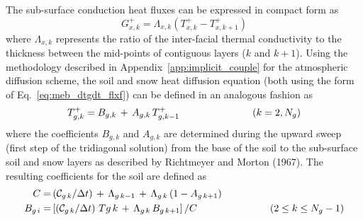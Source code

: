 {The sub-surface conduction heat fluxes 
can be expressed in compact form as
%
\begin{equation}
\label{eq:meb_g_dtgdt_fd}
%
G_{x,k}^+ = \Lambda_{x,k}\left(T_{x,k}^+-T_{x,k+1}^+\right)
%
\end{equation}
%
where $\Lambda_{x,k}$ represents the ratio of the inter-facial thermal conductivity
to the thickness between the mid-points of contiguous layers ($k$ and $k+1$).
%
%
%
%
Using the methodology described in Appendix~\ref{app:implicit_couple}
for the atmospheric diffusion scheme, the soil and snow heat diffusion
equation (both using the form of Eq.~\ref{eq:meb_dtgdt_flxf})
can be defined in an analogous fashion as
%
\begin{equation}
\label{eq:meb_g_dt_rm_sfc}
%
T_{g,k}^+ = B_{g,k} \,+\, A_{g,k} \,T_{g,k-1}^+
\hskip1.in \left(k=2,N_g\right)
%
\end{equation}
%
where the coefficients $B_{g,k}$ and $A_{g,k}$ are determined during the upward
sweep (first step of the tridiagonal solution) from the base of the
soil to the sub-surface soil and snow layers as described by
Richtmeyer and Morton (1967)\nocite{Richtmeyer_Morton_67}. 
The resulting coefficients 
for the soil are defined as
%
\begin{subequations}\label{eq:meb_t_grnd_ni_fd_rm_coefs}
\begin{align}
C = & \left({\cal C}_{g\,k}/\Delta t\right)
\,+\, \Lambda_{g\,k-1} \,+\, \Lambda_{g\,k}\left(1-A_{g\,k+1}\right)
\\
B_{g\,i}= & \left[
\left({\cal C}_{g\,k}/\Delta t\right)
\,T{g\,k} \,+\, \Lambda_{g\,k}\,B_{g\,k+1}
\right]/C
\hskip1.in
\left(2 \leq k \leq N_g-1\right)

\end{align}
\end{subequations}}
